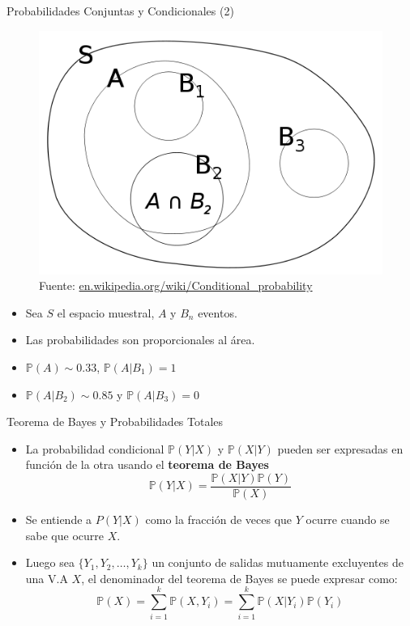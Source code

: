 \documentclass[handout]{beamer}
\begin{document}
\begin{frame}{Probabilidades Conjuntas y Condicionales (2)}
 \begin{figure}[h!]
	\centering
	\includegraphics[scale=0.3]{pics/condicional.png}
	\caption{Fuente: \url{en.wikipedia.org/wiki/Conditional_probability}}
\end{figure}



\scriptsize{
\begin{itemize}
 \item Sea $S$ el espacio muestral, $A$ y $B_n$ eventos.
 \item Las probabilidades son proporcionales al área.
 \item $\mathbb{P}(A) \sim 0.33$, $\mathbb{P}(A|B_1)=1$
 \item $\mathbb{P}(A|B_2)\sim 0.85$ y $\mathbb{P}(A|B_3)=0$ 
\end{itemize}




} 
\end{frame}




\begin{frame}{Teorema de Bayes y Probabilidades Totales}
\scriptsize{
\begin{itemize}
 \item La probabilidad condicional $\mathbb{P}(Y|X)$ y $\mathbb{P}(X|Y)$ pueden ser expresadas en función de la otra usando el \textbf{teorema de Bayes}
\begin{displaymath}
 \mathbb{P}(Y|X)=\frac{\mathbb{P}(X|Y)\mathbb{P}(Y)}{\mathbb{P}(X)}
\end{displaymath}
\item Se entiende a $P(Y|X)$ como la fracción  de veces que $Y$ ocurre cuando se sabe que ocurre $X$.
\item Luego sea $\{ Y_1,Y_2,\dots, Y_k \} $ un conjunto de salidas mutuamente excluyentes de una V.A $X$, el denominador del teorema de Bayes se puede expresar como:
\begin{displaymath}
\mathbb{P}(X)= \sum_{i=1}^{k} \mathbb{P}(X,Y_i) = \sum_{i=1}^{k} \mathbb{P}(X|Y_i)\mathbb{P}(Y_i)
\end{displaymath}
\end{itemize}
 
}
\end{frame}
\end{document}
